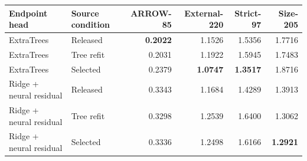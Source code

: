 \begin{tabularx}{\textwidth}{@{}lXrrrr@{}}
\toprule
Endpoint head & Source condition & ARROW-85 & External-220 & Strict-97 & Size-205 \\
\midrule
ExtraTrees & Released & \textbf{0.2022} & 1.1526 & 1.5356 & 1.7716 \\
ExtraTrees & Tree refit & 0.2031 & 1.1922 & 1.5945 & 1.7483 \\
ExtraTrees & Selected & 0.2379 & \textbf{1.0747} & \textbf{1.3517} & 1.8716 \\
\addlinespace
Ridge + neural residual & Released & 0.3343 & 1.1684 & 1.4289 & 1.3913 \\
Ridge + neural residual & Tree refit & 0.3298 & 1.2539 & 1.6400 & 1.3062 \\
Ridge + neural residual & Selected & 0.3336 & 1.2498 & 1.6166 & \textbf{1.2921} \\
\bottomrule
\end{tabularx}

